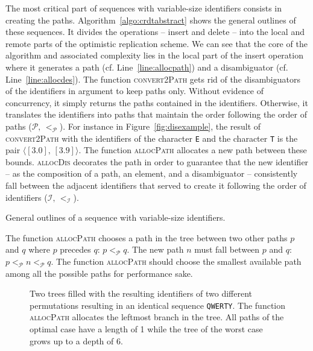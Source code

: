 The most critical part of sequences with variable-size identifiers consists in
creating the paths. Algorithm~\ref{algo:crdtabstract} shows the general outlines
of these sequences. It divides the operations -- insert and delete -- into the
local and remote parts of the optimistic replication scheme. We can see that the
core of the algorithm and associated complexity lies in the local part of the
insert operation where it generates a path (cf. Line~\ref{line:allocpath}) and a
disambiguator (cf. Line~\ref{line:allocdes}). The function \textsc{convert2Path}
gets rid of the disambiguators of the identifiers in argument to keep paths
only. Without evidence of concurrency, it simply returns the paths contained in
the identifiers. Otherwise, it translates the identifiers into paths that
maintain the order following the order of paths
($\mathcal{P},\, <_{\mathcal{P}}$). For instance in Figure~\ref{fig:disexample},
the result of \textsc{convert2Path} with the identifiers of the character
\texttt{E} and the character \texttt{T} is the pair
$\langle [3.0],\, [3.9]\rangle$. The function \textsc{allocPath} allocates a new
path between these bounds.  \textsc{allocDis} decorates the path in order to
guarantee that the new identifier -- as the composition of a path, an element,
and a disambiguator -- consistently fall between the adjacent identifiers that
served to create it following the order of identifiers
($\mathcal{I}, \, <_\mathcal{I}$).

\begin{algorithm}[h]
  
  \caption{\label{algo:crdtabstract}General outlines of a sequence with
    variable-size identifiers.}
\end{algorithm}

The function \textsc{allocPath} chooses a path in the tree between two other paths
$p$ and $q$ where $p$ precedes $q$: $p<_{\mathcal{P}}q$. The new path $n$ must
fall between $p$ and $q$: $p<_\mathcal{P}n<_\mathcal{P}q$.
The function \textsc{allocPath} should choose the smallest available path among all
the possible paths for performance sake.

\begin{figure*}
  \centering
  \hspace{50pt}
  \caption{\label{fig:allocpathexample} Two trees filled with the resulting
    identifiers of two different permutations resulting in an identical sequence
    \texttt{QWERTY}. The function \textsc{allocPath} allocates the leftmost
    branch in the tree. All paths of the optimal case have a length of 1 while
    the tree of the worst case grows up to a depth of 6.}
\end{figure*}

